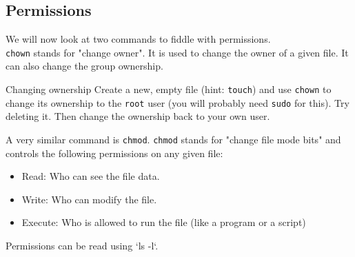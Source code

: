 \documentclass{TheAlternativeCourse}
\begin{document}
\subsection{Permissions}

We will now look at two commands to fiddle with permissions.\\

\texttt{chown} stands for "change owner". It is used to change the owner of a given file. It can also change the group ownership.

\begin{exercisebox}{Changing ownership}
	Create a new, empty file (hint: \texttt{touch}) and use \texttt{chown} to change its ownership to the \texttt{root} user (you will probably need \texttt{sudo} for this). Try deleting it. Then change the ownership back to your own user.
\end{exercisebox}

A very similar command is \texttt{chmod}. \texttt{chmod} stands for "change file mode bits" and controls the following permissions on any given file:
\begin{itemize}
	\item Read: Who can see the file data.
	\item Write: Who can modify the file.
	\item Execute: Who is allowed to run the file (like a program or a script)
\end{itemize}

\begin{hintbox}
Permissions can be read using `ls -l`.
\end{hintbox}
\end{document}
